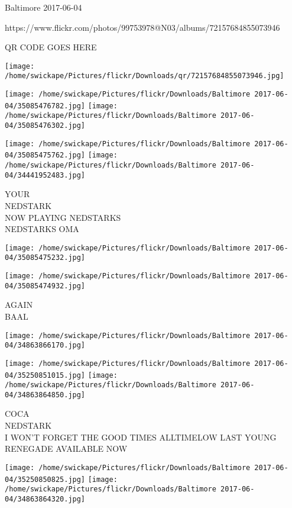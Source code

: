 \documentclass[10pt,letterpaper]{article}
\begin{document}
Baltimore 2017-06-04

https://www.flickr.com/photos/99753978@N03/albums/72157684855073946

QR CODE GOES HERE

\texttt{[image: /home/swickape/Pictures/flickr/Downloads/qr/72157684855073946.jpg]}
\pagebreak

\texttt{[image: /home/swickape/Pictures/flickr/Downloads/Baltimore 2017-06-04/35085476782.jpg]}
\texttt{[image: /home/swickape/Pictures/flickr/Downloads/Baltimore 2017-06-04/35085476302.jpg]}

\texttt{[image: /home/swickape/Pictures/flickr/Downloads/Baltimore 2017-06-04/35085475762.jpg]}
\texttt{[image: /home/swickape/Pictures/flickr/Downloads/Baltimore 2017-06-04/34441952483.jpg]}

YOUR\\
NEDSTARK\\
NOW PLAYING NEDSTARKS\\
NEDSTARKS OMA\\
\pagebreak

\texttt{[image: /home/swickape/Pictures/flickr/Downloads/Baltimore 2017-06-04/35085475232.jpg]}

\vspace{0.25in}
\texttt{[image: /home/swickape/Pictures/flickr/Downloads/Baltimore 2017-06-04/35085474932.jpg]}

AGAIN\\
BAAL\\
\pagebreak

\texttt{[image: /home/swickape/Pictures/flickr/Downloads/Baltimore 2017-06-04/34863866170.jpg]}

\vspace{0.25in}
\texttt{[image: /home/swickape/Pictures/flickr/Downloads/Baltimore 2017-06-04/35250851015.jpg]}
\texttt{[image: /home/swickape/Pictures/flickr/Downloads/Baltimore 2017-06-04/34863864850.jpg]}

COCA\\
NEDSTARK\\
I WON'T FORGET THE GOOD TIMES ALLTIMELOW LAST YOUNG RENEGADE AVAILABLE NOW\\
\pagebreak

\texttt{[image: /home/swickape/Pictures/flickr/Downloads/Baltimore 2017-06-04/35250850825.jpg]}
\texttt{[image: /home/swickape/Pictures/flickr/Downloads/Baltimore 2017-06-04/34863864320.jpg]}
\end{document}
